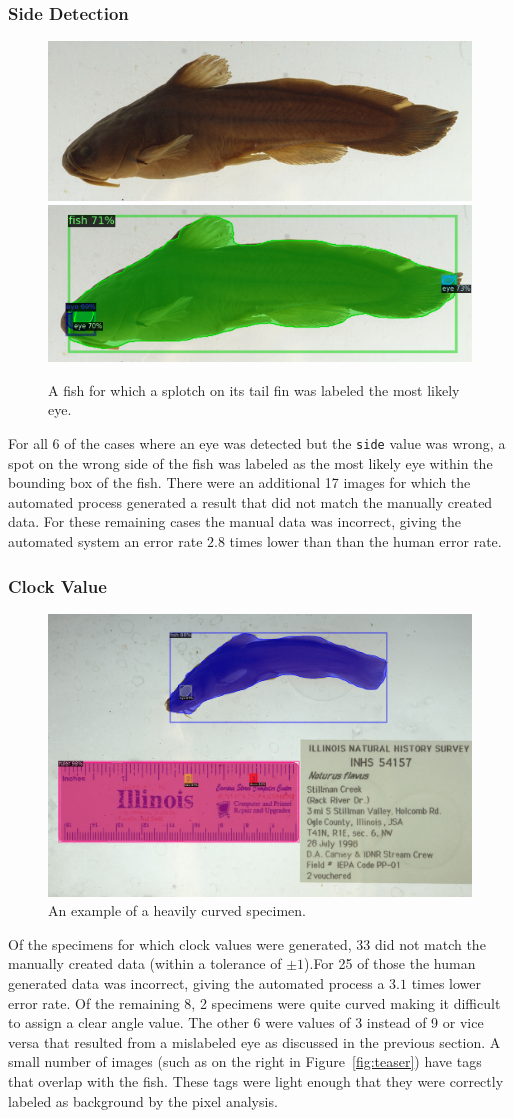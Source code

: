 \documentclass[screen,review]{acmart}
\begin{document}
\subsubsection{Side Detection}
\begin{figure}[H]
  \centering
  \includegraphics[width=0.49\linewidth]{images/wrong_side_orig}
  \includegraphics[width=0.49\linewidth]{images/wrong_side1}
  \caption{A fish for which a splotch on its tail fin was labeled the most likely eye.}
\end{figure}
For all 6 of the cases where an eye was detected but the \verb|side| value was wrong, a spot on the wrong side of the fish was labeled as the most likely eye within the bounding box of the fish. There were an additional 17 images for which the automated process generated a result that did not match the manually created data. For these remaining cases the manual data was incorrect, giving the automated system an error rate \(2.8\) times lower than than the human error rate.

\subsubsection{Clock Value}
\begin{figure}[H]
  \centering
  \includegraphics[width=0.49\linewidth]{images/curved1}
  \caption{An example of a heavily curved specimen.}
\end{figure}
Of the specimens for which clock values were generated, 33 did not match the manually created data (within a tolerance of \(\pm{}1\)).For 25 of those the human generated data was incorrect, giving the automated process a \(3.1\) times lower error rate. Of the remaining 8, 2 specimens were quite curved making it difficult to assign a clear angle value. The other 6 were values of 3 instead of 9 or vice versa that resulted from a mislabeled eye as discussed in the previous section. A small number of images (such as on the right in Figure~\ref{fig:teaser}) have tags that overlap with the fish. These tags were light enough that they were correctly labeled as background by the pixel analysis.
\end{document}
